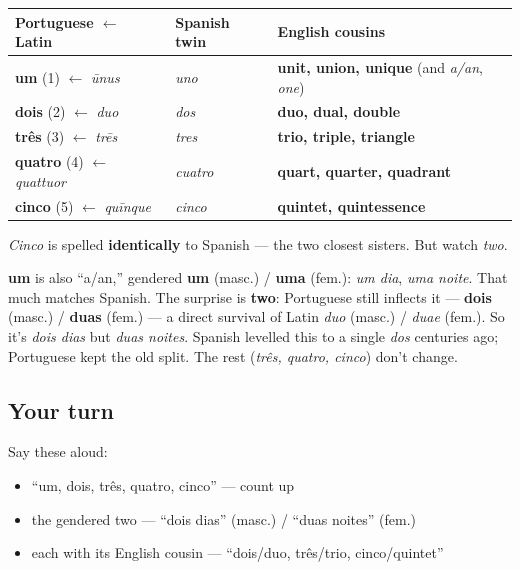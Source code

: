 \begin{cousinweb}
\noindent
\begin{tabularx}{\linewidth}{@{}>{\raggedright\arraybackslash}X>{\raggedright\arraybackslash}X>{\raggedright\arraybackslash}X@{}}
\toprule
\textbf{Portuguese $\leftarrow$ Latin} & \textbf{Spanish twin} & \textbf{English cousins} \\
\midrule
\textbf{um} (1) $\leftarrow$ \emph{ūnus} & \emph{uno} & \textbf{unit, union, unique} (and \emph{a/an}, \emph{one}) \\
\textbf{dois} (2) $\leftarrow$ \emph{duo} & \emph{dos} & \textbf{duo, dual, double} \\
\textbf{três} (3) $\leftarrow$ \emph{trēs} & \emph{tres} & \textbf{trio, triple, triangle} \\
\textbf{quatro} (4) $\leftarrow$ \emph{quattuor} & \emph{cuatro} & \textbf{quart, quarter, quadrant} \\
\textbf{cinco} (5) $\leftarrow$ \emph{quīnque} & \emph{cinco} & \textbf{quintet, quintessence} \\
\bottomrule
\end{tabularx}

\emph{Cinco} is spelled \textbf{identically} to Spanish — the two closest sisters. But watch \emph{two}.
\end{cousinweb}

\begin{grammarlens}[title={Grammar Lens: um/uma and the gendered \textquotedblleft{}two\textquotedblright{} (dois/duas)}]
\textbf{um} is also \textquotedblleft{}a/an,\textquotedblright{} gendered \textbf{um} (masc.) / \textbf{uma} (fem.): \emph{um dia}, \emph{uma noite}. That much matches Spanish. The surprise is \textbf{two}: Portuguese still inflects it — \textbf{dois} (masc.) / \textbf{duas} (fem.) — a direct survival of Latin \emph{duo} (masc.) / \emph{duae} (fem.). So it's \emph{dois dias} but \emph{duas noites}. Spanish levelled this to a single \emph{dos} centuries ago; Portuguese kept the old split. The rest (\emph{três, quatro, cinco}) don't change.
\end{grammarlens}

\subsection*{Your turn}
Say these aloud:

\begin{itemize}
\raggedright
  \item \textquotedblleft{}um, dois, três, quatro, cinco\textquotedblright{} — count up
  \item the gendered two — \textquotedblleft{}dois dias\textquotedblright{} (masc.) / \textquotedblleft{}duas noites\textquotedblright{} (fem.)
  \item each with its English cousin — \textquotedblleft{}dois/duo, três/trio, cinco/quintet\textquotedblright{}
\end{itemize}

